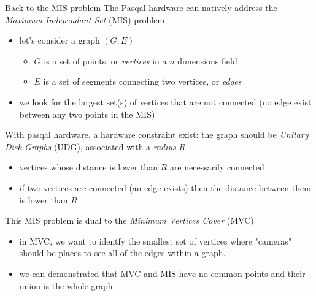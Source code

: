 \begin{frame}{Back to the MIS problem}
The Pasqal hardware can natively address the \textit{Maximum Independant Set} (MIS) problem
\begin{itemize}
    \item let's consider a graph $(G ; E)$
    \begin{itemize}
        \item $G$ is a set of points, or \textit{vertices} in a $n$ dimensions field
        \item $E$ is a set of segments connecting two vertices, or \textit{edges}
    \end{itemize}
    \item we look for the largest set(s) of vertices that are not connected (no edge exist between any two points
    in the MIS)
\end{itemize}

With pasqal hardware, a hardware constraint exist: the graph should be \textit{Unitary Disk Graphs} (UDG), associated 
with a \textit{radius} $R$
\begin{itemize}
    \item vertices whose distance is lower than $R$ are necessarily connected
    \item if two vertices are connected (an edge exists) then the distance between them is lower than $R$
\end{itemize}

This MIS problem is dual to the \textit{Minimum Vertices Cover} (MVC)
\begin{itemize}
    \item in MVC, we want to identfy the smallest set of vertices where "cameras" should be places to see all of the
    edges within a graph.
    \item we can demonstrated that MVC and MIS have no common points and their union is the whole graph.
\end{itemize}
\end{frame}    

